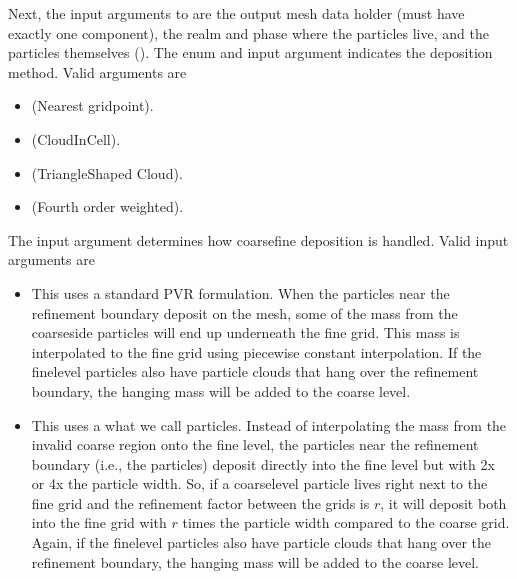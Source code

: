 \documentclass[letterpaper,10pt,english]{sphinxmanual}
\begin{document}
Next, the input arguments to  are the output mesh data holder (must have exactly one component), the realm and phase where the particles live, and the particles themselves ().
The enum  and input argument  indicates the deposition method.
Valid arguments are
\begin{itemize}
\item {} 
 (Nearest grid\sphinxhyphen{}point).

\item {} 
 (Cloud\sphinxhyphen{}In\sphinxhyphen{}Cell).

\item {} 
 (Triangle\sphinxhyphen{}Shaped Cloud).

\item {} 
  (Fourth order weighted).

\end{itemize}

The input argument  determines how coarse\sphinxhyphen{}fine deposition is handled.
Valid input arguments are
\begin{itemize}
\item {} 
 This uses a standard PVR formulation.
When the particles near the refinement boundary deposit on the mesh, some of the mass from the coarse\sphinxhyphen{}side particles will end up underneath the fine grid.
This mass is interpolated to the fine grid using piecewise constant interpolation.
If the fine\sphinxhyphen{}level particles also have particle clouds that hang over the refinement boundary, the hanging mass will be added to the coarse level.

\item {} 
 This uses a what we call  particles.
Instead of interpolating the mass from the invalid coarse region onto the fine level, the particles near the refinement boundary (i.e., the  particles) deposit directly into the fine level but with 2x or 4x the particle width.
So, if a coarse\sphinxhyphen{}level particle lives right next to the fine grid and the refinement factor between the grids is \(r\), it will deposit both into the fine grid with \(r\) times the particle width compared to the coarse grid.
Again, if the fine\sphinxhyphen{}level particles also have particle clouds that hang over the refinement boundary, the hanging mass will be added to the coarse level.

\end{itemize}
\end{document}

